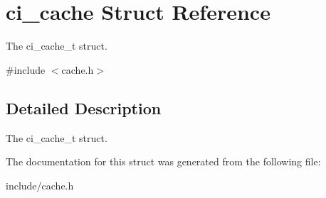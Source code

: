 \hypertarget{structci__cache}{
\section{ci\_\-cache Struct Reference}
\label{structci__cache}
}


The ci\_\-cache\_\-t struct.  


{\ttfamily \#include $<$cache.h$>$}

\subsection{Detailed Description}
The ci\_\-cache\_\-t struct. 

The documentation for this struct was generated from the following file:\begin{DoxyCompactItemize}
\item 
include/cache.h\end{DoxyCompactItemize}
